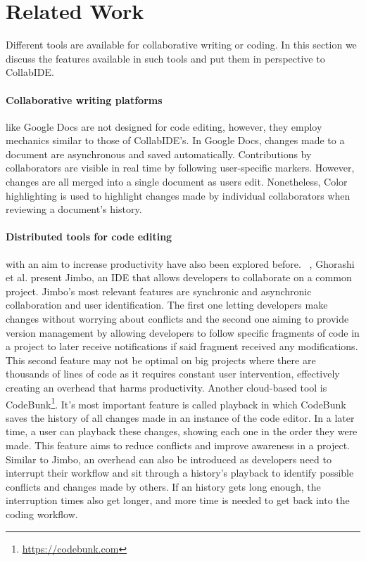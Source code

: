 

\section{Related Work}
\label{sec:related}

Different tools are available for collaborative writing or coding.
In this section we discuss the features available in such tools and put them in perspective to CollabIDE.

\paragraph
{Collaborative writing platforms} like Google Docs are not designed for code editing, however, they employ mechanics similar to those of CollabIDE’s. In Google Docs, changes made to a document are asynchronous and saved automatically. Contributions by collaborators are visible in real time by following user-specific markers. However,  changes are all merged into a single document as users edit. Nonetheless, Color highlighting is used to highlight changes made by individual collaborators when reviewing a document’s history.

\paragraph
{Distributed tools for code editing} with an aim to increase productivity have also been explored before. ~\cite{ghorashi}, Ghorashi et al. present Jimbo, an IDE that allows developers to collaborate on a common project. Jimbo’s most relevant features are synchronic and asynchronic collaboration and user identification. The first one letting developers make changes without worrying about conflicts and the second one aiming to provide version management by allowing developers to follow specific fragments of code in a project to later receive notifications if said fragment received any modifications. This second feature may not be optimal on big projects where there are thousands of lines of code as it requires constant user intervention, effectively creating an overhead that harms productivity. Another cloud-based tool is CodeBunk\footnote{\url{https://codebunk.com}}. It’s most important feature is called playback in which CodeBunk saves the history of all changes made in an instance of the code editor. In a later time, a user can playback these changes, showing each one in the order they were made. This feature aims to reduce conflicts and improve awareness in a project. Similar to Jimbo, an overhead can also be introduced as developers need to interrupt their workflow and sit through a history’s playback to identify possible conflicts and changes made by others. If an history gets long enough, the interruption times also get longer, and more time is needed to get back into the coding workflow.


